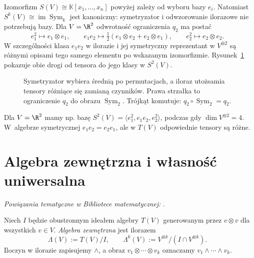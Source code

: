 Izomorfizm $S(V)\cong\mathbb K[x_1,\ldots,x_n]$ powyżej zależy
od wyboru bazy $e_i$. Natomiast
$S^k(V)\cong\operatorname{im}\operatorname{Sym}_k$ jest kanoniczny:
symetryzator i odwzorowanie ilorazowe nie potrzebują bazy.
Dla $V=\R^2$ odwrotność ograniczenia $q_2$ ma postać
\[
 e_1^2\longmapsto e_1\otimes e_1,\qquad
 e_1e_2\longmapsto\tfrac12(e_1\otimes e_2+e_2\otimes e_1),
 \qquad e_2^2\longmapsto e_2\otimes e_2.
\]
W szczególności klasa $e_1e_2$ w ilorazie i jej symetryczny
reprezentant w $V^{\otimes2}$ są różnymi opisami tego samego
elementu po wskazanym izomorfizmie.
Rysunek~\ref{fig:sym-iloraz} pokazuje obie drogi od tensora
do jego klasy w $S^2(V)$.
\begin{figure}[H]
\centering
{}
\caption{Symetryzator wybiera średnią po permutacjach,
a iloraz utożsamia tensory różniące się zamianą czynników.
Prawa strzałka to ograniczenie $q_2$ do obrazu $\operatorname{Sym}_2$.
Trójkąt komutuje: $q_2\circ\operatorname{Sym}_2=q_2$.}
\label{fig:sym-iloraz}
\end{figure}

Dla $V=\R^2$ mamy np. bazę
$S^2(V)=\langle e_1^2,e_1e_2,e_2^2\rangle$,
podczas gdy $\dim V^{\otimes2}=4$. W~algebrze symetrycznej
$e_1e_2=e_2e_1$, ale w $T(V)$ odpowiednie tensory są różne.

\section{Algebra zewnętrzna i własność uniwersalna}
\label{sec:algebra-zewnetrzna}

\noindent\emph{Powiązania tematyczne w Bibliotece matematycznej:} .


\begin{definicja}
\label{def:algebra-zewnetrzna}
Niech $I$ będzie obustronnym ideałem algebry $T(V)$
generowanym przez $v\otimes v$ dla wszystkich $v\in V$.
\emph{Algebra zewnętrzna} jest ilorazem
\[
 \Lambda(V):=T(V)/I,
 \qquad \Lambda^k(V):=V^{\otimes k}/(I\cap V^{\otimes k}).
\]
Iloczyn w ilorazie zapisujemy $\wedge$, a obraz
$v_1\otimes\cdots\otimes v_k$ oznaczamy
$v_1\wedge\cdots\wedge v_k$.
\end{definicja}

